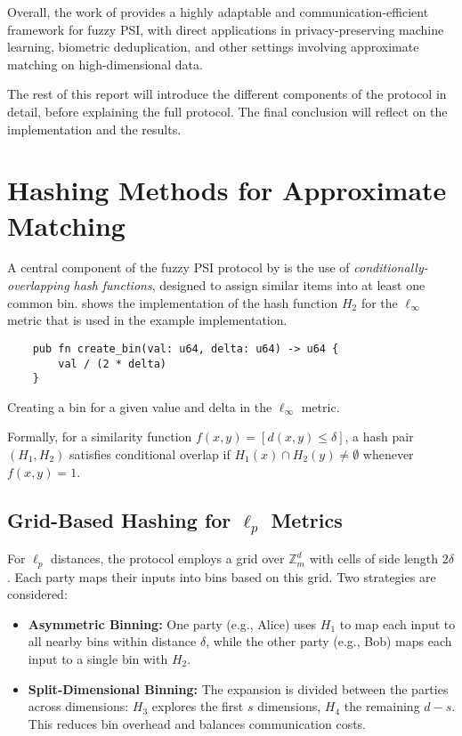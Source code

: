 Overall, the work of \textcite{richardsonFuzzyPSIOblivious2024} provides a highly adaptable and communication-efficient framework for fuzzy PSI, with direct applications in privacy-preserving machine learning, biometric deduplication, and other settings involving approximate matching on high-dimensional data.

The rest of this report will introduce the different components of the protocol in detail, before explaining the full protocol. The final conclusion will reflect on the implementation and the results.

\section{Hashing Methods for Approximate Matching}

A central component of the fuzzy PSI protocol by \textcite{richardsonFuzzyPSIOblivious2024} is the use of \emph{conditionally-overlapping hash functions}, designed to assign similar items into at least one common bin.  shows the implementation of the hash function $H_2$ for the $\ell_\infty$ metric that is used in the example implementation.

\begin{listing}[h]
	\begin{verbatim}
    pub fn create_bin(val: u64, delta: u64) -> u64 {
        val / (2 * delta)
    }
  \end{verbatim}
	\caption{Creating a bin for a given value and delta in the $\ell_\infty$ metric.}
	\label{lst:h2-hash}
\end{listing}

Formally, for a similarity function $f(x, y) = [d(x, y) \leq \delta]$, a hash pair $(H_1, H_2)$ satisfies conditional overlap if $H_1(x) \cap H_2(y) \neq \emptyset$ whenever $f(x, y) = 1$.

\subsection{Grid-Based Hashing for $\ell_p$ Metrics}

For $\ell_p$ distances, the protocol employs a grid over $\mathbb{Z}_m^d$ with cells of side length $2\delta$. Each party maps their inputs into bins based on this grid. Two strategies are considered:

\begin{itemize}
	\item \textbf{Asymmetric Binning:} One party (e.g., Alice) uses $H_1$ to map each input to all nearby bins within distance $\delta$, while the other party (e.g., Bob) maps each input to a single bin with $H_2$.

	\item \textbf{Split-Dimensional Binning:} The expansion is divided between the parties across dimensions: $H_3$ explores the first $s$ dimensions, $H_4$ the remaining $d-s$. This reduces bin overhead and balances communication costs.
\end{itemize}

